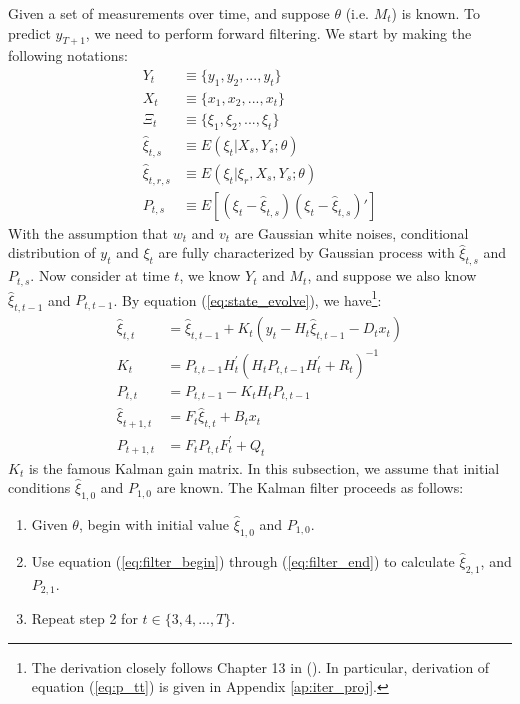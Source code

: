 \documentclass[12pt]{article}
\newenvironment{boenumerate}
    {\begin{enumerate}\renewcommand\labelenumi{\textbf\theenumi}}
    {\end{enumerate}}
\numberwithin{equation}{section}
\begin{document}
Given a set of measurements over time, and suppose $\theta$ (i.e. $M_t$) is known. To predict $y_{T+1}$, we need to perform forward filtering. We start by making the following notations:
\begin{align*}
    Y_t &\equiv \{y_1, y_2, ..., y_t\} \\
    X_t &\equiv \{x_1, x_2, ..., x_t\} \\
    \Xi_t &\equiv \{\xi_1,\xi_2,...,\xi_t\} \\
    \hat{\xi}_{t,s} &\equiv E(\xi_t|X_{s},Y_{s};\theta) \\
    \hat{\xi}_{t,r,s} &\equiv E(\xi_t|\xi_r,X_{s},Y_{s};\theta) \\
    P_{t,s} &\equiv E[(\xi_t-\hat{\xi}_{t,s})(\xi_t-\hat{\xi}_{t,s})']
\end{align*}
With the assumption that $w_t$ and $v_t$ are Gaussian white noises, conditional distribution of $y_t$ and $\xi_t$ are fully characterized by Gaussian process with $\hat{\xi}_{t,s}$ and $P_{t,s}$. Now consider at time $t$, we know $Y_t$ and $M_t$, and suppose we also know $\hat{\xi}_{t,t-1}$ and $P_{t,t-1}$. By equation (\ref{eq:state_evolve}), we have\footnote{The derivation closely follows Chapter 13 in (\cite{hamilton_1994}). In particular, derivation of equation (\ref{eq:p_tt}) is given in Appendix \ref{ap:iter_proj}.}:
\begin{align}
    \hat{\xi}_{t,t} &= \hat{\xi}_{t,t-1} + K_t(y_t-H_t\hat{\xi}_{t,t-1}-D_tx_t) \label{eq:filter_begin} \\
    K_t &= P_{t,t-1}H_t^{'}(H_tP_{t,t-1}H_t^{'}+R_t)^{-1} \label{eq:gain} \\
    P_{t,t} &= P_{t,t-1} - K_tH_tP_{t,t-1} \label{eq:p_tt} \\
    \hat{\xi}_{t+1,t} &= F_t\hat{\xi}_{t,t} + B_tx_t \label{eq:xi_t1} \\
    P_{t+1,t} &= F_tP_{t,t}F_t^{'}+Q_t \label{eq:filter_end}
\end{align}
$K_t$ is the famous Kalman gain matrix. In this subsection, we assume that initial conditions $\hat{\xi}_{1,0}$ and $P_{1,0}$ are known. The Kalman filter proceeds as follows:
\begin{boenumerate}
    \item Given $\theta$, begin with initial value $\hat{\xi}_{1,0}$ and $P_{1,0}$.
    \item Use equation (\ref{eq:filter_begin}) through (\ref{eq:filter_end}) to calculate $\hat{\xi}_{2,1}$, and $P_{2,1}$.
    \item Repeat step 2 for $t\in\{3, 4, ..., T\}$.
\end{boenumerate}
\end{document}
